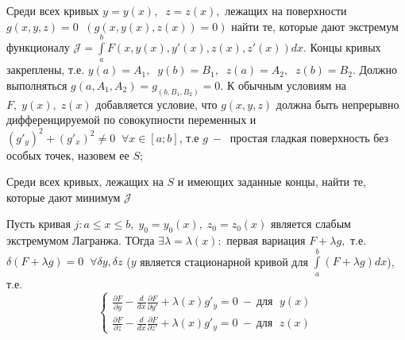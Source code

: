 \documentclass{article}
\begin{document}
Среди всех кривых $y=y(x),\;\; z=z(x),$ лежащих на поверхности $g(x,y,z)=0\;\;(g(x,y(x),z(x))=0)$ найти те, которые дают экстремум функционалу $\mathcal{J}=\int\limits_a^b F(x,y(x),y'(x),z(x),z'(x))d x$. Концы кривых закреплены, т.е. $y(a)=A_1, \;\; y(b)=B_1,\;\;z(a)=A_2,\;\;z(b)=B_2$.
Должно выполняться $g(a,A_1,A_2)= g_(b,B_1,B_2)=0$. К обычным условиям на $F,\;y(x),\;z(x)$ добавляется условие, что $g(x,y,z)$ должна быть непрерывно дифференцируемой по совокупности переменных и $(g'_y)^2+(g'_x)^2\neq 0\;\; \forall x\in[a;b]$, т.е $g ~-~$ простая гладкая поверхность без особых точек, назовем ее $S$;\par
Среди всех кривых, лежащих на $S$ и имеющих заданные концы, найти те, которые дают минимум $\mathcal{J}$
\begin{theorem}
Пусть кривая $j:a\leqslant x\leqslant b,\; y_0=y_0(x),\;z_0=z_0(x)$ является слабым экстремумом Лагранжа. ТОгда $\exists \lambda=\lambda(x):$ первая вариация $F+\lambda g,$ т.е. $\delta(F+\lambda g)=0 \;\; \forall \delta y, \delta z$ ($y$ является стационарной кривой для $\int\limits_a^b(F+\lambda g)d x$), т.е.
\begin{equation*}
\begin{cases}
\frac{\partial F}{\partial y} - \frac{d}{d x}\frac{\partial F}{\partial y'}+\lambda (x)g'_y=0 ~-~\text{для } \;y(x)\\
\frac{\partial F}{\partial z} - \frac{d}{d x}\frac{\partial F}{\partial z'}+\lambda (x)g'_y=0 ~-~\text{для } \;z(x)
\end{cases}\end{equation*}
\end{theorem}
\end{document}
